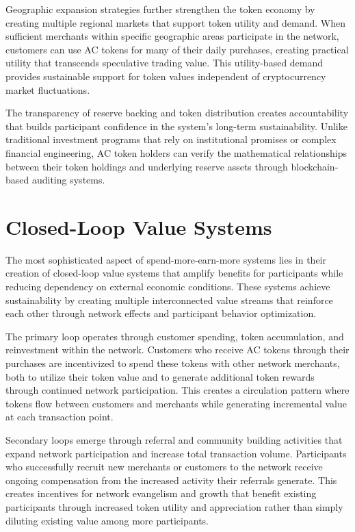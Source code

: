 \documentclass[
  Letterpaper,
]{scrbook}
\begin{document}
Geographic expansion strategies further strengthen the token economy by
creating multiple regional markets that support token utility and
demand. When sufficient merchants within specific geographic areas
participate in the network, customers can use AC tokens for many of
their daily purchases, creating practical utility that transcends
speculative trading value. This utility-based demand provides
sustainable support for token values independent of cryptocurrency
market fluctuations.

The transparency of reserve backing and token distribution creates
accountability that builds participant confidence in the system's
long-term sustainability. Unlike traditional investment programs that
rely on institutional promises or complex financial engineering, AC
token holders can verify the mathematical relationships between their
token holdings and underlying reserve assets through blockchain-based
auditing systems.

\section{Closed-Loop Value Systems}\label{closed-loop-value-systems}

The most sophisticated aspect of spend-more-earn-more systems lies in
their creation of closed-loop value systems that amplify benefits for
participants while reducing dependency on external economic conditions.
These systems achieve sustainability by creating multiple interconnected
value streams that reinforce each other through network effects and
participant behavior optimization.

The primary loop operates through customer spending, token accumulation,
and reinvestment within the network. Customers who receive AC tokens
through their purchases are incentivized to spend these tokens with
other network merchants, both to utilize their token value and to
generate additional token rewards through continued network
participation. This creates a circulation pattern where tokens flow
between customers and merchants while generating incremental value at
each transaction point.

Secondary loops emerge through referral and community building
activities that expand network participation and increase total
transaction volume. Participants who successfully recruit new merchants
or customers to the network receive ongoing compensation from the
increased activity their referrals generate. This creates incentives for
network evangelism and growth that benefit existing participants through
increased token utility and appreciation rather than simply diluting
existing value among more participants.
\end{document}
